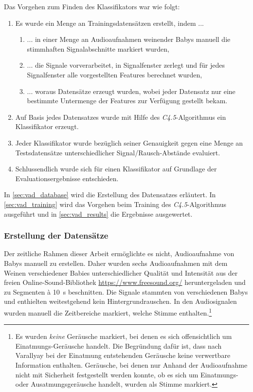 Das Vorgehen zum Finden des Klassifikators war wie folgt:
\begin{enumerate}
\item Es wurde ein Menge an Trainingsdatensätzen erstellt, indem ...
	\begin{enumerate}[label*=\arabic*.]
	\item ... in einer Menge an Audioaufnahmen weinender Babys manuell die stimmhaften Signalabschnitte markiert wurden,
	\item ... die Signale vorverarbeitet, in Signalfenster zerlegt und für jedes Signalfenster alle vorgestellten Features berechnet wurden,
	\item ... woraus Datensätze erzeugt wurden, wobei jeder Datensatz nur eine bestimmte Untermenge der Features zur Verfügung gestellt bekam.
	\end{enumerate}
\item Auf Basis jedes Datensatzes wurde mit Hilfe des \emph{C4.5}-Algorithmus ein Klassifikator erzeugt.
\item Jeder Klassifikator wurde bezüglich seiner Genauigkeit gegen eine Menge an Testsdatensätze unterschiedlicher Signal/Rausch-Abstände evaluiert.
\item Schlussendlich wurde sich für einen Klassifikator auf Grundlage der Evaluationsergebnisse entschieden.
\end{enumerate}

In \autoref{sec:vad_database} wird die Erstellung des Datensatzes erläutert. In \autoref{sec:vad_training} wird das Vorgehen beim Training des \emph{C4.5}-Algorithmus ausgeführt und in \autoref{sec:vad_results} die Ergebnisse ausgewertet.

\subsubsection{Erstellung der Datensätze}
\label{sec:vad_database}

Der zeitliche Rahmen dieser Arbeit ermöglichte es nicht, Audioaufnahme von Babys manuell zu erstellen. Daher wurden sechs Audioaufnahmen mit dem Weinen verschiedener Babies unterschiedlicher Qualität und Intensität aus der freien Online-Sound-Bibliothek \url{https://www.freesound.org/} heruntergeladen und zu Segmenten \`{a} \SI{10}{\second} beschnitten. Die Signale stammten von verschiedenen Babys und enthielten weitestgehend kein Hintergrundrauschen. In den Audiosignalen wurden manuell die Zeitbereiche markiert, welche Stimme enthalten.\footnote{Es wurden \emph{keine} Geräusche markiert, bei denen es sich offensichtlich um Einatmungs-Geräusche handelt. Die Begründung dafür ist, dass nach Varallyay \cite{cry_thesis} bei der Einatmung entstehenden Geräusche keine verwertbare Information enthalten. Geräusche, bei denen nur Anhand der Audioaufnahme nicht mit Sicherheit festgestellt werden konnte, ob es sich um Einatmungs- oder Ausatmungsgeräusche handelt, wurden als Stimme markiert.}

